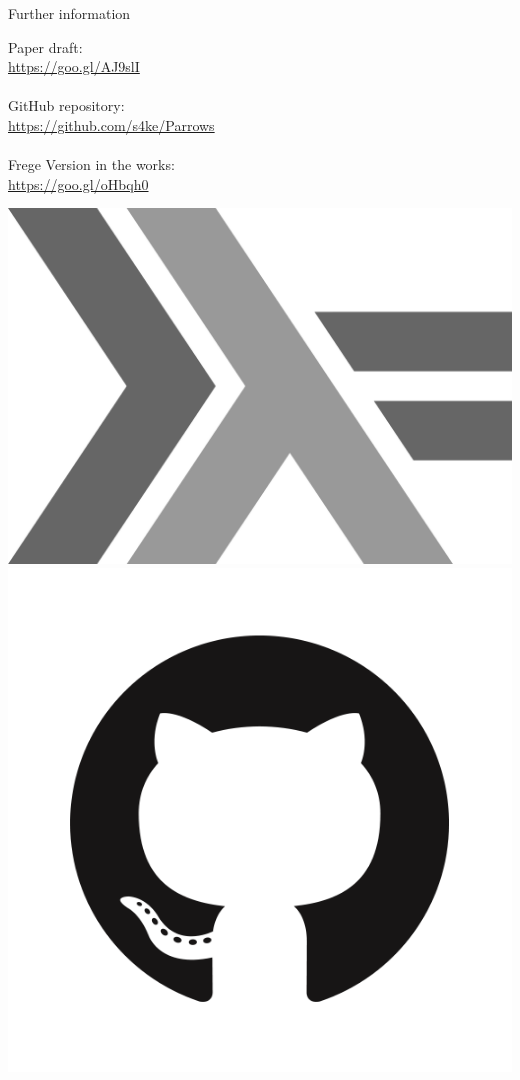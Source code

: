 \begin{frame}[fragile]{Further information}
	\begin{minipage}{0.6\textwidth}
	Paper draft:\\
	\url{https://goo.gl/AJ9slI}\\~\\
	GitHub repository:\\
	\url{https://github.com/s4ke/Parrows}\\~\\
	Frege Version in the works:\\
	\url{https://goo.gl/oHbqh0}
	\end{minipage}
	\hfill
	\begin{minipage}{0.3\textwidth}
		\begin{center}
			\vspace{0.5cm}
			\includegraphics[scale=0.025]{images/haskell-logo}\\
			\vspace{0.3cm}
			\includegraphics[scale=0.1]{images/GitHub-Mark}\\

\end{center}
\end{minipage}
\end{frame}
